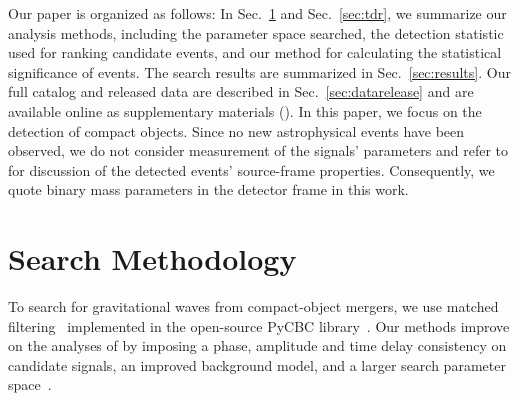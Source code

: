 Our paper is organized as follows: In Sec.~\ref{sec:search} and Sec.~\ref{sec:tdr}, we summarize our analysis methods, including the parameter space searched, the detection statistic used for ranking candidate events, and our method for calculating the statistical significance of events. The search results are summarized in Sec.~\ref{sec:results}.  Our full catalog and released data are
described in Sec.~\ref{sec:datarelease} and are available online as supplementary materials (\release). In this paper, we focus on the detection of compact objects. Since no new astrophysical events have been observed, we do not consider measurement of the signals' parameters and refer to \cite{TheLIGOScientific:2016pea,Biwer:2018osg} for discussion of the detected events' source-frame properties. Consequently, we quote binary mass parameters in the detector frame in this work.

\section{Search Methodology}
\label{sec:search}

To search for gravitational waves from compact-object mergers, we use matched filtering~\citep{Allen:2005fk} implemented in the open-source PyCBC library~\citep{Usman:2015kfa,Canton:2014ena,pycbc-github}. Our methods improve on the analyses of \cite{TheLIGOScientific:2016pea,Abbott:2016ymx,TheLIGOScientific:2016qqj} by imposing a phase, amplitude and time delay consistency on candidate signals, an improved background model, and a larger search parameter space~\citep{Nitz:2017svb, Nitz:2017lco, DalCanton:2017ala}.

